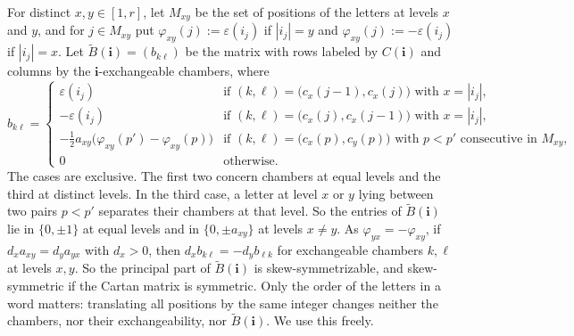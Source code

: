 \documentclass[a4paper]{amsart}
\numberwithin{equation}{section}
\theoremstyle{definition}
\theoremstyle{remark}
\newcommand{\bfi}{\mathbf{i}}
\newcommand{\tB}{\widetilde{B}}
\begin{document}
For distinct $x,y\in[1,r]$, let $M_{xy}$ be the set of positions of the letters at levels $x$ and $y$, and for $j\in M_{xy}$ put $\varphi_{xy}(j):=\varepsilon(i_j)$ if $|i_j|=y$ and $\varphi_{xy}(j):=-\varepsilon(i_j)$ if $|i_j|=x$.
Let $\tB(\bfi)=(b_{k\ell})$ be the matrix with rows labeled by $C(\bfi)$ and columns by the $\bfi$-exchangeable chambers, where
\begin{equation}
  \label{eq: B entries}
  b_{k\ell}=
  \begin{cases}
    \varepsilon(i_j) & \text{if } (k,\ell)=\big(c_x(j-1),c_x(j)\big) \text{ with } x=|i_j|,\\
    -\varepsilon(i_j) & \text{if } (k,\ell)=\big(c_x(j),c_x(j-1)\big) \text{ with } x=|i_j|,\\
    -\frac12a_{xy}\big(\varphi_{xy}(p')-\varphi_{xy}(p)\big) & \text{if } (k,\ell)=\big(c_x(p),c_y(p)\big) \text{ with } p<p' \text{ consecutive in } M_{xy},\\
    0 & \text{otherwise.}
  \end{cases}
\end{equation}
The cases are exclusive. The first two concern chambers at equal levels and the third at distinct levels. In the third case, a letter at level $x$ or $y$ lying between two pairs $p<p'$ separates their chambers at that level.
So the entries of $\tB(\bfi)$ lie in $\{0,\pm1\}$ at equal levels and in $\{0,\pm a_{xy}\}$ at levels $x\neq y$.
As $\varphi_{yx}=-\varphi_{xy}$, if $d_xa_{xy}=d_ya_{yx}$ with $d_x>0$, then $d_xb_{k\ell}=-d_yb_{\ell k}$ for exchangeable chambers $k,\ell$ at levels $x,y$.
  So the principal part of $\tB(\bfi)$ is skew-symmetrizable, and skew-symmetric if the Cartan matrix is symmetric.
Only the order of the letters in a word matters: translating all positions by the same integer changes neither the chambers, nor their exchangeability, nor $\tB(\bfi)$. We use this freely.
\end{document}
